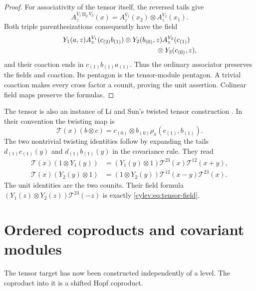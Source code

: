 \begin{proof}
For associativity of the tensor itself, the reversed tails give
\begin{equation}\label{cylev:eq:tensor-annihilation}
 A_z^{V_1\boxtimes_\rho V_2}(x)
       =A_z^{V_1}(x_2)\otimes A_z^{V_2}(x_1).
\end{equation}
Both triple parenthesizations consequently have the field
\begin{equation}\label{cylev:eq:triple-field}
\begin{split}
 &Y_1(a,z)A_z^{V_1}(c_{(2)}b_{(1)})
     \otimes Y_2(b_{(0)},z)A_z^{V_2}(c_{(1)})\\
 &\hspace{47mm}\otimes Y_3(c_{(0)},z),
\end{split}
\end{equation}
and their coaction ends in $c_{(1)}b_{(1)}a_{(1)}$.
Thus the ordinary associator preserves the fields and coaction.
Its pentagon is the tensor-module pentagon.
A trivial coaction makes every cross factor a counit, proving the
unit assertion. Colinear field maps preserve the formulas.
\end{proof}

The tensor is also an instance of Li and Sun's twisted tensor
construction \cite[Definition~2.2 and Theorem~2.4]{LiSun2011}.
In their convention the twisting map is
\[
 \mathscr T(x)(b\otimes c)
       =c_{(0)}\otimes b_{(0)}\rho_x(c_{(1)},b_{(1)}).
\]
The two nontrivial twisting identities follow by expanding the tails
$d_{(1)}c_{(1)}(y)$ and $d_{(1)}b_{(1)}(y)$ in the covariance rule.
They read
\begin{align*}
 \mathscr T(x)(1\otimes Y_1(y))
   &=(Y_1(y)\otimes1)\mathscr T^{23}(x)\mathscr T^{12}(x+y),\\
 \mathscr T(x)(Y_2(y)\otimes1)
   &=(1\otimes Y_2(y))\mathscr T^{12}(x-y)\mathscr T^{23}(x).
\end{align*}
The unit identities are the two counits.
Their field formula $(Y_1(z)\otimes Y_2(z))\mathscr T^{23}(-z)$
is exactly \eqref{cylev:eq:tensor-field}.

\section{Ordered coproducts and covariant modules}

The tensor target has now been constructed independently of a level.
The coproduct into it is a shifted Hopf coproduct.

